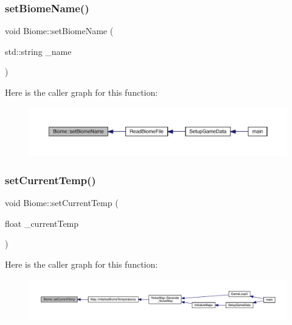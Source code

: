 \mbox{\label{class_biome_a4b702cd936eb35364493be9e3e3c4166}} 
\subsubsection{\texorpdfstring{set\+Biome\+Name()}{setBiomeName()}}
{\footnotesize\ttfamily void Biome\+::set\+Biome\+Name (\begin{DoxyParamCaption}\item[{std\+::string}]{\+\_\+name }\end{DoxyParamCaption})}

Here is the caller graph for this function\+:
\nopagebreak
\begin{figure}[H]
\begin{center}
\leavevmode
\includegraphics[width=350pt]{class_biome_a4b702cd936eb35364493be9e3e3c4166_icgraph}
\end{center}
\end{figure}
\mbox{\label{class_biome_a73164a278cfd1c3c6cf52a6b006034e0}} 
\subsubsection{\texorpdfstring{set\+Current\+Temp()}{setCurrentTemp()}}
{\footnotesize\ttfamily void Biome\+::set\+Current\+Temp (\begin{DoxyParamCaption}\item[{float}]{\+\_\+current\+Temp }\end{DoxyParamCaption})}

Here is the caller graph for this function\+:
\nopagebreak
\begin{figure}[H]
\begin{center}
\leavevmode
\includegraphics[width=350pt]{class_biome_a73164a278cfd1c3c6cf52a6b006034e0_icgraph}
\end{center}
\end{figure}
\mbox{\label{class_biome_acc568302ef1e66d443d2e43d94b36a10}} 

